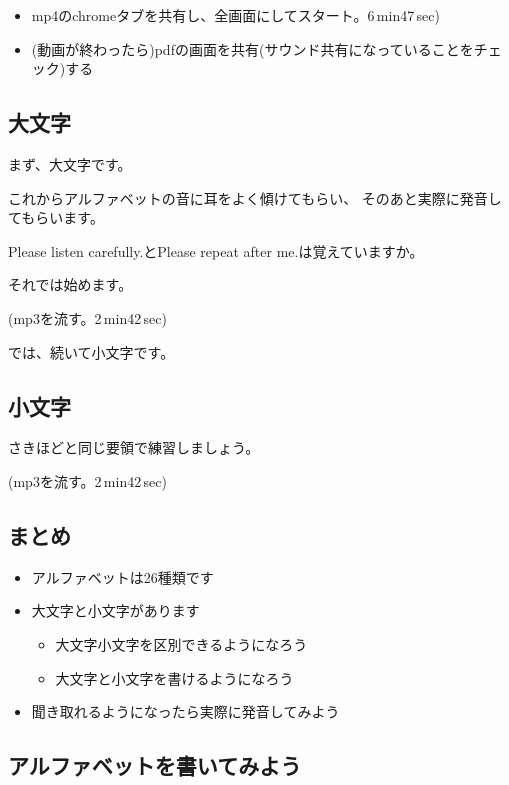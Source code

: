 \documentclass[12pt]{jlreq}
\begin{document}
\begin{tcolorbox}[title=zoomの管理ボタンで]
\begin{itemize}
 \item mp4のchromeタブを共有し、全画面にしてスタート。6\,min47\,sec)
 \item (動画が終わったら)pdfの画面を共有(サウンド共有になっていることをチェック)する
\end{itemize}
 
\end{tcolorbox}



\subsection{大文字}

まず、大文字です。

これからアルファベットの音に耳をよく傾けてもらい、
そのあと実際に発音してもらいます。

Please listen carefully.とPlease repeat after me.は覚えていますか。

それでは始めます。

(mp3を流す。2\,min42\,sec)

では、続いて小文字です。

\subsection{小文字}

さきほどと同じ要領で練習しましょう。


(mp3を流す。2\,min42\,sec)


\subsection{まとめ}

\begin{itemize}
 \item アルファベットは26種類です
 \item 大文字と小文字があります
       \begin{itemize}
	\item 大文字小文字を区別できるようになろう
        \item 大文字と小文字を書けるようになろう
       \end{itemize}
 \item 聞き取れるようになったら実際に発音してみよう
\end{itemize}

\subsection{アルファベットを書いてみよう}
\end{document}
